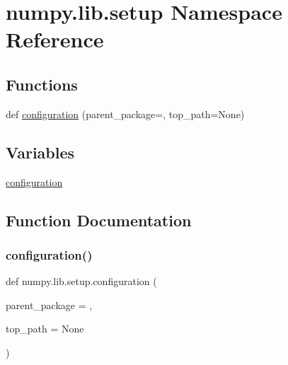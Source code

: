 \hypertarget{namespacenumpy_1_1lib_1_1setup}{}\section{numpy.\+lib.\+setup Namespace Reference}
\label{namespacenumpy_1_1lib_1_1setup}
\subsection*{Functions}
\begin{DoxyCompactItemize}
\item 
def \hyperlink{namespacenumpy_1_1lib_1_1setup_ada4aaf07ef70246edd91c1cc3b8b8b24}{configuration} (parent\+\_\+package=\textquotesingle{}\textquotesingle{}, top\+\_\+path=None)
\end{DoxyCompactItemize}
\subsection*{Variables}
\begin{DoxyCompactItemize}
\item 
\hyperlink{namespacenumpy_1_1lib_1_1setup_a9f3e3fed31559e02eeca21457063ec8f}{configuration}
\end{DoxyCompactItemize}


\subsection{Function Documentation}
\mbox{\label{namespacenumpy_1_1lib_1_1setup_ada4aaf07ef70246edd91c1cc3b8b8b24}} 
\subsubsection{\texorpdfstring{configuration()}{configuration()}}
{\footnotesize\ttfamily def numpy.\+lib.\+setup.\+configuration (\begin{DoxyParamCaption}\item[{}]{parent\+\_\+package = {\ttfamily \textquotesingle{}\textquotesingle{}},  }\item[{}]{top\+\_\+path = {\ttfamily None} }\end{DoxyParamCaption})}



